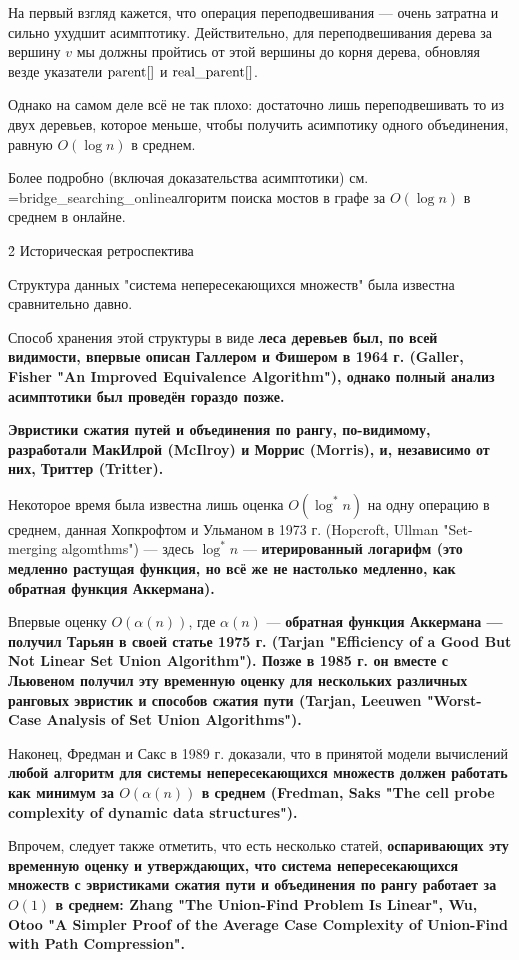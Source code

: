 На первый взгляд кажется, что операция переподвешивания --- очень затратна и сильно ухудшит асимптотику. Действительно, для переподвешивания дерева за вершину $v$ мы должны пройтись от этой вершины до корня дерева, обновляя везде указатели ${\rm parent}[]$ и ${\rm real\_parent}[]$.

Однако на самом деле всё не так плохо: достаточно лишь переподвешивать то из двух деревьев, которое меньше, чтобы получить асимпотику одного объединения, равную $O (\log n)$ в среднем.

Более подробно (включая доказательства асимптотики) см. \algohref=bridge_searching_online{алгоритм поиска мостов в графе за $O(\log n)$ в среднем в онлайне}.




\h2{ Историческая ретроспектива }

Структура данных "система непересекающихся множеств" была известна сравнительно давно.

Способ хранения этой структуры в виде \bf{леса деревьев} был, по всей видимости, впервые описан Галлером и Фишером в 1964 г. (Galler, Fisher "An Improved Equivalence Algorithm"), однако полный анализ асимптотики был проведён гораздо позже.

\bf{Эвристики} сжатия путей и объединения по рангу, по-видимому, разработали МакИлрой (McIlroy) и Моррис (Morris), и, независимо от них, Триттер (Tritter).

Некоторое время была известна лишь оценка $O(\log^* n)$ на одну операцию в среднем, данная Хопкрофтом и Ульманом в 1973 г. (Hopcroft, Ullman "Set-merging algomthms") --- здесь $\log^* n$ --- \bf{итерированный логарифм} (это медленно растущая функция, но всё же не настолько медленно, как обратная функция Аккермана).

Впервые оценку $O (\alpha(n))$, где $\alpha(n)$ --- \bf{обратная функция Аккермана} --- получил Тарьян в своей статье 1975 г. (Tarjan "Efficiency of a Good But Not Linear Set Union Algorithm"). Позже в 1985 г. он вместе с Льювеном получил эту временную оценку для нескольких различных ранговых эвристик и способов сжатия пути (Tarjan, Leeuwen "Worst-Case Analysis of Set Union Algorithms").

Наконец, Фредман и Сакс в 1989 г. доказали, что в принятой модели вычислений \bf{любой} алгоритм для системы непересекающихся множеств должен работать как минимум за $O(\alpha(n))$ в среднем (Fredman, Saks "The cell probe complexity of dynamic data structures").

Впрочем, следует также отметить, что есть несколько статей, \bf{оспаривающих} эту временную оценку и утверждающих, что система непересекающихся множеств с эвристиками сжатия пути и объединения по рангу работает за $O(1)$ в среднем: Zhang "The Union-Find Problem Is Linear", Wu, Otoo "A Simpler Proof of the Average Case Complexity of Union-Find with Path Compression".



